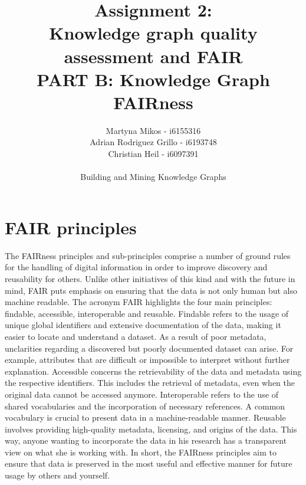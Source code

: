 \documentclass[11pt]{article}
\title{Assignment 2:\\ Knowledge graph quality assessment and FAIR\\
PART B: Knowledge Graph FAIRness}
\author{Martyna Mikos - i6155316\\
Adrian Rodriguez Grillo - i6193748\\
Christian Heil - i6097391\\\\ Building and Mining Knowledge Graphs}
\begin{document}
\maketitle
\section{FAIR principles}
The FAIRness principles and sub-principles comprise a number of ground rules for the handling of digital information in order to improve discovery and reusability for others. Unlike other initiatives of this kind and with the future in mind, FAIR puts emphasis on ensuring that the data is not only human but also machine readable. The acronym FAIR highlights the four main principles: findable, accessible, interoperable and reusable. Findable refers to the usage of unique global identifiers and extensive documentation of the data, making it easier to locate and understand a dataset. As a result of poor metadata, unclarities regarding a discovered but poorly documented dataset can arise. For example, attributes that are difficult or impossible to interpret without further explanation. Accessible concerns the retrievability of the data and metadata using the respective identifiers. This includes the retrieval of metadata, even when the original data cannot be accessed anymore. Interoperable refers to the use of shared vocabularies and the incorporation of necessary references. A common vocabulary is crucial to present data in a machine-readable manner. Reusable involves providing high-quality metadata, licensing, and origins of the data. This way, anyone wanting to incorporate the data in his research has a transparent view on what she is working with. In short, the FAIRness principles aim to ensure that data is preserved in the most useful and effective manner for future usage by others and yourself.


\newpage
\end{document}
